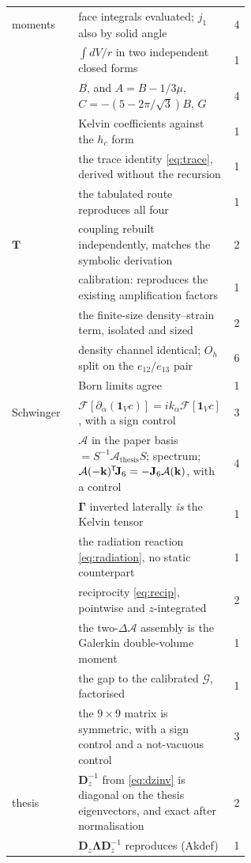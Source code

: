\documentclass[11pt,a4paper]{article}
\newcommand{\Aop}{\mathcal{A}}
\newcommand{\dA}{\Delta\mathcal{A}}
\newcommand{\Jsix}{\mathbf{J}_{6}}
\newcommand{\Oh}{O_{h}}
\newcommand{\tp}{^{\mkern-1.5mu\mathsf{T}}}
\begin{document}
\begin{longtable}{@{}l>{\raggedright\arraybackslash}p{0.60\linewidth}r@{}}
\midrule
moments & face integrals evaluated; $j_1$ also by solid angle & 4\\
        & $\int dV/r$ in two independent closed forms & 1\\
        & $B$, and $A = B - 1/3\mu$, $C = -(5-2\pi/\!\sqrt3)B$, $G$ & 4\\
        & Kelvin coefficients against the $h_c$ form & 1\\
        & the trace identity \eqref{eq:trace}, derived without the recursion & 1\\
        & the tabulated route reproduces all four & 1\\
\midrule
$\mathbf{T}$ & coupling rebuilt independently, matches the symbolic derivation & 2\\
             & calibration: reproduces the existing amplification factors & 1\\
             & the finite-size density--strain term, isolated and sized & 2\\
             & density channel identical; $\Oh$ split on the $e_{12}/e_{13}$ pair & 6\\
             & Born limits agree & 1\\
\midrule
Schwinger & $\mathcal{F}[\partial_\alpha(\mathbf{1}_Vc)] = ik_\alpha
            \mathcal{F}[\mathbf{1}_Vc]$, with a sign control & 3\\
          & $\Aop$ in the paper basis $= S^{-1}\Aop_{\text{thesis}}S$; spectrum;
            $\Aop(-\mathbf{k})\tp\!\Jsix = -\Jsix\Aop(\mathbf{k})$,
            with a control & 4\\
          & $\boldsymbol\Gamma$ inverted laterally \emph{is} the Kelvin tensor & 1\\
          & the radiation reaction \eqref{eq:radiation}, no static counterpart & 1\\
          & reciprocity \eqref{eq:recip}, pointwise and $z$-integrated & 2\\
          & the two-$\dA$ assembly is the Galerkin double-volume moment & 1\\
          & the gap to the calibrated $\mathcal{G}$, factorised & 1\\
          & the $9\times9$ matrix is symmetric, with a sign control and a
            not-vacuous control & 3\\
\midrule
thesis & $\mathbf{D}_z^{-1}$ from \eqref{eq:dzinv} is diagonal on the thesis
         eigenvectors, and exact after normalisation & 2\\
       & $\mathbf{D}_z\boldsymbol\Lambda\mathbf{D}_z^{-1}$ reproduces (Akdef) & 1\\

\end{longtable}
\end{document}
